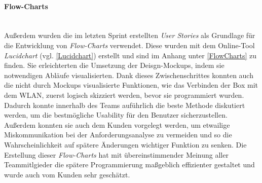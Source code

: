 \documentclass[10pt, a4paper]{article}
\begin{document}
\begin{onehalfspace}
\paragraph*{Flow-Charts} $~$ \\
Außerdem wurden die im letzten Sprint erstellten \textit{User Stories} als Grundlage für die Entwicklung von \textit{Flow-Charts} verwendet.
Diese wurden mit dem Online-Tool \textit{Lucidchart} (vgl. \ref*{Lucidchart}) erstellt und sind im Anhang unter \ref*{FlowCharts} zu finden.
Sie erleichterten die Umsetzung der Deisgn-Mockups, indem sie notwendigen Abläufe visualisierten.
Dank dieses Zwischenschrittes konnten auch die nicht durch Mockups visualisierte Funktionen, wie das Verbinden der Box mit dem WLAN, zuerst logisch skizziert
werden, bevor sie programmiert wurden. Dadurch konnte innerhalb des Teams auführlich die beste Methode diskutiert werden, um die bestmögliche Usability
für den Benutzer sicherzustellen. Außerdem konnten sie auch dem Kunden vorgelegt werden, um etwailige Miskommunikation bei der Anforderungsanalyse zu vermeiden
und so die Wahrscheinlichkeit auf spätere Änderungen wichtiger Funktion zu senken. Die Erstellung dieser \textit{Flow-Charts} hat mit übereinstimmender
Meinung aller Teammitlgieder die spätere Programmierung maßgeblich effizienter gestaltet und wurde auch vom Kunden sehr geschätzt.



\end{onehalfspace}
\end{document}
